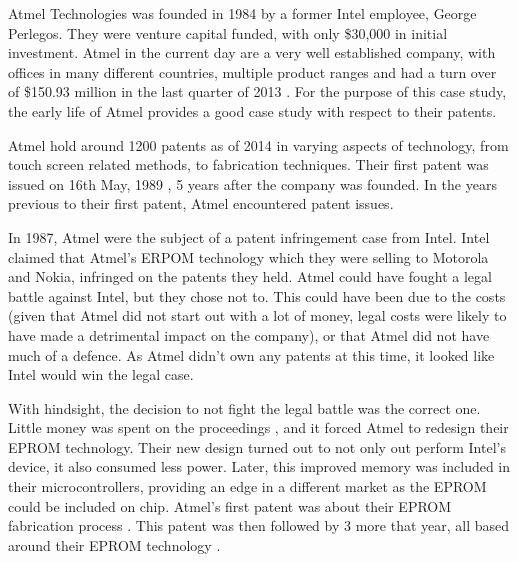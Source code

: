 
{}


Atmel Technologies was founded in 1984 by a former Intel employee, George Perlegos.
They were venture capital funded, with only \$30,000 in initial investment.
Atmel in the current day are a very well established company, with offices in many different countries, multiple product ranges and had a turn over of \$150.93 million in the last quarter of 2013 \cite{atmel:profit}.
For the purpose of this case study, the early life of Atmel provides a good case study with respect to their patents.


Atmel hold around 1200 patents as of 2014 \cite{atmelpatents} in varying aspects of technology, from touch screen related methods, to fabrication techniques.
Their first patent was issued on 16th May, 1989 \cite{atmel:eprompatent}, 5 years after the company was founded.
In the years previous to their first patent, Atmel encountered patent issues.

In 1987, Atmel were the subject of a patent infringement case from Intel.
Intel claimed that Atmel's ERPOM technology which they were selling to Motorola and Nokia, infringed on the patents they held.
Atmel could have fought a legal battle against Intel, but they chose not to. 
This could have been due to the costs (given that Atmel did not start out with a lot of money, legal costs were likely to have made a detrimental impact on the company), or that Atmel did not have much of a defence.
As Atmel didn't own any patents at this time, it looked like Intel would win the legal case. 

With hindsight, the decision to not fight the legal battle was the correct one. 
Little money was spent on the proceedings , and it forced Atmel to redesign their EPROM technology.
Their new design turned out to not only out perform Intel's device, it also consumed less power.
Later, this improved memory was included in their microcontrollers, providing an edge in a different market as the EPROM could be included on chip.
Atmel's first patent was about their EPROM fabrication process \cite{atmel:eprompatent}.
This patent was then followed by 3 more that year, all based around their EPROM technology \cite{atmel:eprom1,atmel:eprom2,atmel:eprom3}.

